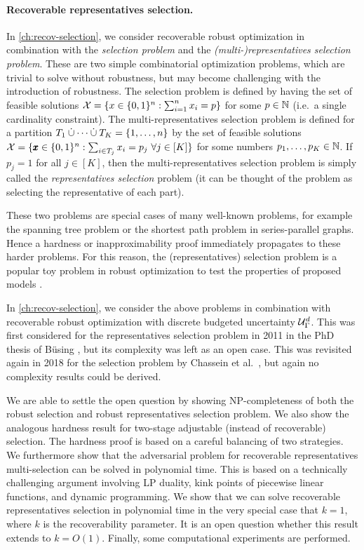 \paragraph*{Recoverable representatives selection.}
In \cref{ch:recov-selection}, we consider recoverable robust optimization in combination with the \emph{selection problem} and the \emph{(multi-)representatives selection problem}. 
These are two simple combinatorial optimization problems, which are trivial to solve without robustness, but may become challenging with the introduction of robustness.
The selection problem is defined by having the set of feasible solutions $\mathcal{X} = \{ x \in \{ 0,1 \}^n : \sum_{i=1}^n x_i = p \}$ for some $p \in \mathbb{N}$ (i.e.\ a single cardinality constraint). 
The multi-representatives selection problem is defined for a partition $T_1 \dotunion \dots \dotunion T_K = \fromto{1}{n}$ by the set of feasible solutions $\mathcal{X} = \{  \pmb{x}\in \{0,1\}^n : \sum_{i\in T_j} x_i = p_j\ \forall j \in [K]  \}$ for some numbers $p_1,\dots,p_K \in \mathbb{N}$. If $p_j = 1$ for all $j \in [K]$, then the multi-representatives selection problem is simply called the \emph{representatives selection} problem (it can be thought of the problem as selecting the representative of each part).


These two problems are special cases of many well-known problems, for example the spanning tree problem or the shortest path problem in series-parallel graphs. Hence a hardness or inapproximability proof immediately propagates to these harder problems. For this reason, the (representatives) selection problem is a popular toy problem in robust optimization to test the properties of proposed models \cite{kasperski2015approximability,averbakh2001complexity,conde2004improved,dolgui2012min,deineko2013complexity,goerigk2019robust} 
.

In \cref{ch:recov-selection}, we consider the above problems in combination with recoverable robust optimization with discrete budgeted uncertainty $\mathcal{U}^d_\Gamma$. 
This was first considered for the representatives selection problem in 2011 in the PhD thesis of Büsing \cite{busing2011phd}, but its complexity was left as an open case. 
This was revisited again in 2018 for the selection problem by Chassein et al.\ \cite{chassein2018recoverable}, but again no complexity results could be derived. 

We are able to settle the open question by showing NP-completeness of both the robust selection and robust representatives selection problem. We also show the  analogous hardness result for two-stage adjustable (instead of recoverable) selection.
The hardness proof is based on a careful balancing of two strategies. We furthermore show that the adversarial problem for recoverable representatives multi-selection can be solved in polynomial time. This is based on a technically challenging argument involving LP duality, kink points of piecewise linear functions, and dynamic programming.
We show that we can solve recoverable representatives selection in polynomial time in the very special case that $k=1$, where $k$ is the recoverability parameter. It is an open question whether this result extends to $k = O(1)$. Finally, some computational experiments are performed.
 
